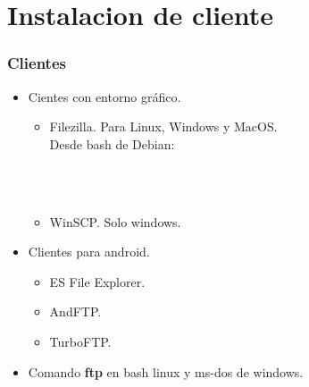 \section{Instalacion de cliente}
  \begin{frame}
    \frametitle{Clientes}
    \begin{itemize}
    	\item Cientes con entorno gr\'afico.
		\begin{itemize}
	   	 \item Filezilla. Para Linux, Windows y MacOS.\\
	   	 	Desde bash de Debian:
	   	 	\begin{shell}
	     	 \\ \\
	    	\hline\end{shell}
	   	 \item WinSCP. Solo windows.
	    \end{itemize}

	    \item Clientes para android.
		\begin{itemize}
	   	 \item ES File Explorer.
	   	 \item AndFTP.
	   	 \item TurboFTP. 
	    \end{itemize}
	   	\item Comando {\bf ftp} en bash linux y ms-dos de windows.
	  \end{itemize}
  \end{frame}